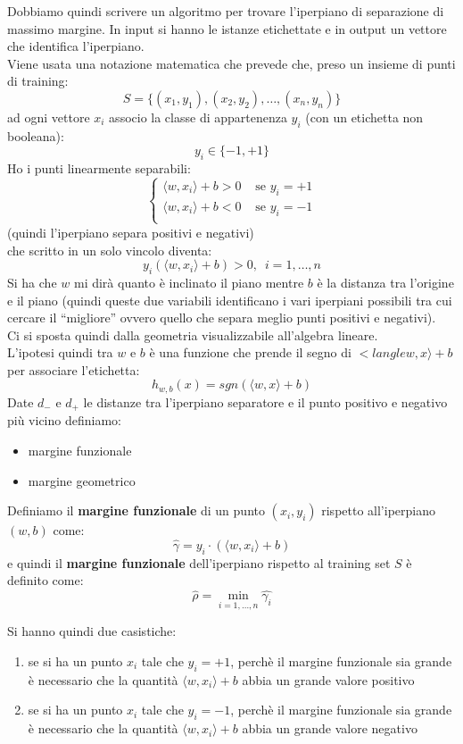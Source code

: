 Dobbiamo quindi scrivere un algoritmo per trovare l'iperpiano di separazione di
massimo margine. In input si hanno le istanze etichettate e in output un
vettore che identifica l'iperpiano.\\
Viene usata una notazione matematica che prevede che, preso un insieme di punti
di training:
\[S = \{(x_1,y_1), (x_2,y_2),\ldots, (x_n,y_n)\}\]
ad ogni vettore $x_i$ associo la classe di appartenenza $y_i$ (con un etichetta
non booleana):
\[y_i\in\{-1,+1\}\]
Ho i punti linearmente separabili:
\[
  \begin{cases}
    \langle w,x_i\rangle + b >0 &\mbox{ se }y_i=+1\\
    \langle w,x_i\rangle + b <0 &\mbox{ se }y_i=-1\\
  \end{cases}
\](quindi l'iperpiano separa positivi e negativi)\\
che scritto in un solo vincolo diventa:
\[y_i(\langle w,x_i\rangle + b )>0,\,\,\,i=1,\ldots, n\]
Si ha che $w$ mi dirà quanto è inclinato il piano mentre $b$ è la distanza tra
l'origine e il piano (quindi queste due variabili identificano i vari iperpiani
possibili tra cui cercare il ``migliore'' ovvero quello che separa meglio punti
positivi e negativi).\\
Ci si sposta quindi dalla geometria visualizzabile all'algebra lineare.\\
L'ipotesi quindi tra $w$ e $b$ è una funzione che prende il segno di $<langle
w,x\rangle+b$ per associare l'etichetta:
\[h_{w,b}(x)=sgn(\langle w,x\rangle+b)\]
Date $d_-$ e $d_+$ le distanze tra l’iperpiano separatore e il punto positivo e
negativo più vicino definiamo:
\begin{itemize}
  \item margine funzionale
  \item margine geometrico
\end{itemize}
\begin{definizione}
  Definiamo il \textbf{margine funzionale} di un punto $(x_i,y_i)$ rispetto
  all'iperpiano $(w,b)$ come:
  \[\hat{\gamma}=y_i\cdot(\langle w,x_i\rangle+b)\]
  e quindi il \textbf{margine funzionale} dell'iperpiano rispetto al training
  set $S$ è definito come:
  \[\hat{\rho}=\min_{i=1,\ldots,n}\hat{\gamma_i}\]
\end{definizione}
Si hanno quindi due casistiche:
\begin{enumerate}
  \item se si ha un punto $x_i$ tale che $y_i=+1$, perchè il margine funzionale
  sia grande è necessario che la quantità
  $\langle w,x_i\rangle+b$ abbia un grande valore positivo
  \item se si ha un punto $x_i$ tale che $y_i=-1$, perchè il margine funzionale
  sia grande è necessario che  la quantità
  $\langle w,x_i\rangle+b$ abbia un grande valore negativo
\end{enumerate}
